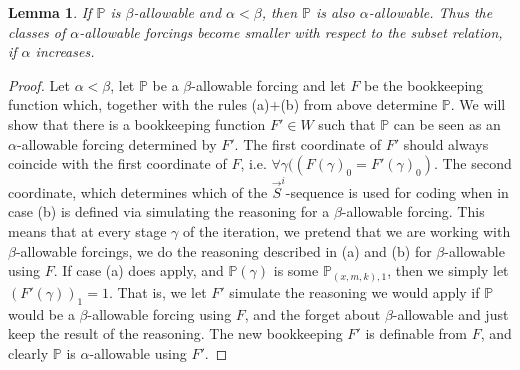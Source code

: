 \documentclass[a4paper,11pt]{article}
\newtheorem{lemma}[theorem]{Lemma}
\newcommand{\forceP}{\mathbb{P}}
\begin{document}
\begin{lemma}
If $\forceP$ is $\beta$-allowable and $\alpha < \beta$, then $\forceP$ is also $\alpha$-allowable. Thus the classes of $\alpha$-allowable forcings become smaller with respect to the subset relation, if $\alpha$ increases.
\end{lemma}
\begin{proof}
Let $\alpha < \beta$, let $\forceP$ be a $\beta$-allowable forcing and let $F$ be the bookkeeping function which, together with the rules (a)+(b) from above determine $\forceP$. We will show that there is a bookkeeping function $F' \in W$ such that $\forceP$ can be seen as an $\alpha$-allowable forcing determined by $F'$. The first coordinate of $F'$ should always coincide with the first coordinate of $F$, i.e. $\forall \gamma ((F(\gamma)_0=F'(\gamma)_0)$. The second coordinate, which determines  which of the  $\vec{S}^i$-sequence is used for coding when in case (b) is defined via simulating the reasoning for a $\beta$-allowable forcing. This means that at every stage $\gamma$ of the iteration, we pretend that we are working with $\beta$-allowable forcings, we do the reasoning described in (a) and (b) for $\beta$-allowable using $F$. If case (a) does apply, and $\forceP(\gamma)$ is some $\forceP_{(x,m,k),1}$, then we simply let $(F'(\gamma))_1=1$.  That is, we let $F'$ simulate the reasoning we would apply if $\forceP$ would be a $\beta$-allowable forcing using $F$, and the forget about $\beta$-allowable and just keep the result of the reasoning. The new bookkeeping $F'$ is definable from $F$, and clearly $\forceP$ is $\alpha$-allowable using $F'$.

\end{proof}
\end{document}
